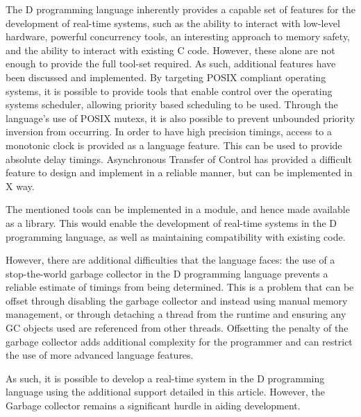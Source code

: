 



The D programming language inherently provides a capable set of features for the 
development of real-time systems, such as the ability to interact with low-level 
hardware, powerful concurrency tools, an interesting approach to memory 
safety, and the ability to interact with existing C code. 
However, these alone are not enough to provide the full tool-set required. As such, 
additional features have been discussed and implemented. 
By targeting POSIX compliant operating systems, it is possible 
to provide tools that enable control over the operating systems scheduler, 
allowing priority based scheduling to be used. 
Through the 
language's use of POSIX mutexs, it is also possible to prevent unbounded 
priority inversion from occurring.
In order to have high precision timings, access to a monotonic clock is provided 
as a language feature. This can be used to provide absolute delay timings. 
Asynchronous Transfer of Control has provided a difficult feature to design and 
implement in a reliable manner, but can be implemented in X way.
\par\bigskip\noindent
The mentioned tools can be implemented in a module, and hence made available as 
a library. 
This would enable the development of real-time systems in the D programming 
language, as well as maintaining compatibility with existing code. 
\par\bigskip\noindent
However, there are additional difficulties that the 
language faces: the use of a stop-the-world garbage collector in the 
D programming language prevents a reliable estimate of timings from being determined. 
This is a problem that can be offset through disabling the garbage collector 
and instead using manual memory management, or through detaching a thread from the 
runtime and ensuring any GC objects used are referenced from other threads.
Offsetting the penalty of the garbage collector adds additional complexity for 
the programmer and can restrict the use of more advanced language features. 
\par\bigskip\noindent
As such, it is possible to develop a real-time system in the D programming 
language using the additional support detailed in this article. However, 
the Garbage collector remains a significant hurdle in aiding development.
